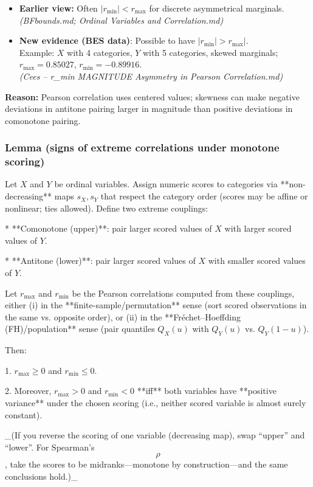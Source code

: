 \documentclass[
  letterpaper,
  DIV=11,
  numbers=noendperiod]{scrartcl}
\providecommand{\tightlist}{%
  \setlength{\itemsep}{0pt}\setlength{\parskip}{0pt}}
\theoremstyle{remark}
\begin{document}
\begin{itemize}
\tightlist
\item
  \textbf{Earlier view:} Often \(|r_{\min}| < r_{\max}\) for discrete
  asymmetrical marginals.\\
  \emph{(BFbounds.md; Ordinal Variables and Correlation.md)}
\item
  \textbf{New evidence (BES data)}: Possible to have
  \(|r_{\min}| > r_{\max}|\).\\
  Example: \(X\) with 4 categories, \(Y\) with 5 categories, skewed
  marginals;\\
  \(r_{\max} = 0.85027\), \(r_{\min} = -0.89916\).\\
  \emph{(Cees -- r\_min MAGNITUDE Asymmetry in Pearson Correlation.md)}
\end{itemize}

\textbf{Reason:} Pearson correlation uses centered values; skewness can
make negative deviations in antitone pairing larger in magnitude than
positive deviations in comonotone pairing.

\subsubsection{Lemma (signs of extreme correlations under monotone
scoring)}\label{lemma-signs-of-extreme-correlations-under-monotone-scoring}

\label{prop-max-product}
\begin{lemma}

Let $X$ and $Y$ be ordinal variables. Assign numeric scores to categories via **non-decreasing** maps $s_X, s_Y$ that respect the category order (scores may be affine or nonlinear; ties allowed). Define two extreme couplings:

* **Comonotone (upper)**: pair larger scored values of $X$ with larger scored values of $Y$.
    
* **Antitone (lower)**: pair larger scored values of $X$ with smaller scored values of $Y$.
    

Let $r_{\max}$ and $r_{\min}$ be the Pearson correlations computed from these couplings, either (i) in the **finite-sample/permutation** sense (sort scored observations in the same vs. opposite order), or (ii) in the **Fréchet–Hoeffding (FH)/population** sense (pair quantiles $Q_X(u)$ with $Q_Y(u)$ vs. $Q_Y(1-u)$).

Then:

1. $r_{\max}\ge 0$ and $r_{\min}\le 0$.
    
2. Moreover, $r_{\max}>0$ and $r_{\min}<0$ **iff** both variables have **positive variance** under the chosen scoring (i.e., neither scored variable is almost surely constant).
    

_(If you reverse the scoring of one variable (decreasing map), swap “upper” and “lower”. For Spearman’s $$\rho$$, take the scores to be midranks—monotone by construction—and the same conclusions hold.)_
\end{lemma}
\end{document}
